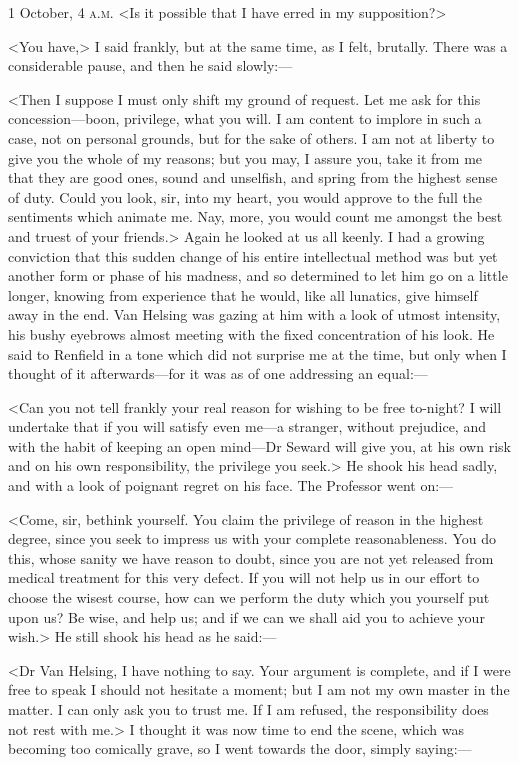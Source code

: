 \begin{diary}{1 October, 4 \textsc{a.m.}}
<Is it possible that I have erred in my supposition?>

<You have,> I said frankly, but at the same time, as I felt, brutally. There was a considerable pause, and then he said slowly:—

<Then I suppose I must only shift my ground of request. Let me ask for this concession—boon, privilege, what you will. I am content to implore in such a case, not on personal grounds, but for the sake of others. I am not at liberty to give you the whole of my reasons; but you may, I assure you, take it from me that they are good ones, sound and unselfish, and spring from the highest sense of duty. Could you look, sir, into my heart, you would approve to the full the sentiments which animate me. Nay, more, you would count me amongst the best and truest of your friends.> Again he looked at us all keenly. I had a growing conviction that this sudden change of his entire intellectual method was but yet another form or phase of his madness, and so determined to let him go on a little longer, knowing from experience that he would, like all lunatics, give himself away in the end. Van Helsing was gazing at him with a look of utmost intensity, his bushy eyebrows almost meeting with the fixed concentration of his look. He said to Renfield in a tone which did not surprise me at the time, but only when I thought of it afterwards—for it was as of one addressing an equal:—

<Can you not tell frankly your real reason for wishing to be free to-night? I will undertake that if you will satisfy even me—a stranger, without prejudice, and with the habit of keeping an open mind—Dr Seward will give you, at his own risk and on his own responsibility, the privilege you seek.> He shook his head sadly, and with a look of poignant regret on his face. The Professor went on:—

<Come, sir, bethink yourself. You claim the privilege of reason in the highest degree, since you seek to impress us with your complete reasonableness. You do this, whose sanity we have reason to doubt, since you are not yet released from medical treatment for this very defect. If you will not help us in our effort to choose the wisest course, how can we perform the duty which you yourself put upon us? Be wise, and help us; and if we can we shall aid you to achieve your wish.> He still shook his head as he said:—

<Dr Van Helsing, I have nothing to say. Your argument is complete, and if I were free to speak I should not hesitate a moment; but I am not my own master in the matter. I can only ask you to trust me. If I am refused, the responsibility does not rest with me.> I thought it was now time to end the scene, which was becoming too comically grave, so I went towards the door, simply saying:—


\end{diary}
